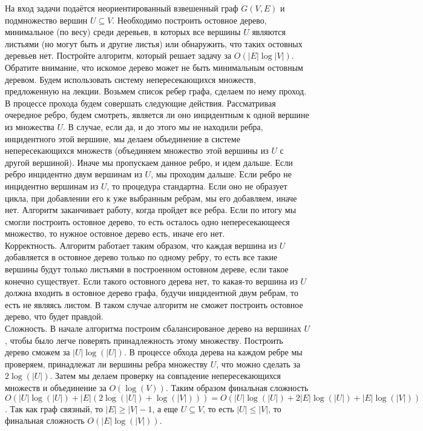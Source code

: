 \documentclass[12pt]{extreport}
\theoremstyle{definiton}
\theoremstyle{definition}
\theoremstyle{definition}
\let\leq\leqslant
\let\geq\geqslant
\begin{document}
	\Pr[4] На вход задачи подаётся неориентированный взвешенный граф $G(V,E)$ и подмножество вершин $U \subseteq V$. Необходимо построить остовное дерево, минимальное (по весу) среди деревьев, в которых все вершины $U$ являются листьями (но могут быть и другие листья) или обнаружить, что таких остовных деревьев нет. Постройте алгоритм, который решает задачу за $O(|E|\log |V|)$. Обратите внимание, что искомое дерево может не быть минимальным остовным деревом.
    \newline
    Будем использовать систему непересекающихся множеств, предложенную на лекции. Возьмем список ребер графа, сделаем по нему проход. В процессе прохода будем совершать следующие действия. Рассматривая очередное ребро, будем смотреть, является ли оно инцидентным к одной вершине из множества $U$. В случае, если да, и до этого мы не находили ребра, инцидентного этой вершине, мы делаем объединение в системе непересекающихся множеств (объединяем множество этой вершины из $U$ с другой вершиной). Иначе мы пропускаем данное ребро, и идем дальше. Если ребро инцидентно двум вершинам из $U$, мы проходим дальше. Если ребро не инцидентно вершинам из $U$, то процедура стандартна. Если оно не образует цикла, при добавлении его к уже выбранным ребрам, мы его добавляем, иначе нет. Алгоритм заканчивает работу, когда пройдет все ребра. Если по итогу мы смогли построить остовное дерево, то есть осталось одно непересекающееся множество, то нужное остовное дерево есть, иначе его нет.\\
    Корректность. Алгоритм работает таким образом, что каждая вершина из $U$ добавляется в остовное дерево только по одному ребру, то есть все такие вершины будут только листьями в построенном остовном дереве, если такое конечно существует. Если такого остовного дерева нет, то какая-то вершина из $U$ должна входить в остовное дерево графа, будучи инцидентной двум ребрам, то есть не являясь листом. В таком случае алгоритм не сможет построить остовное дерево, что будет правдой.\\
    Сложность. В начале алгоритма построим сбалансированое дерево на вершинах $U$, чтобы было легче поверять принадлежность этому множеству. Построить дерево сможем за $|U|\log(|U|)$. В процессе обхода дерева на каждом ребре мы проверяем, принадлежат ли вершины ребра множеству $U$, что можно сделать за $2\log(|U|)$. Затем мы делаем проверку на совпадение непересекающихся множеств и объединение за $O(\log(V))$. Таким образом финальная сложность $O(|U|\log(|U|) + |E|(2\log(|U|) + \log(|V|))) = O(|U|\log(|U|) + 2|E|\log(|U|) + |E|\log(|V|))$. Так как граф связный, то $|E| \geq |V| - 1$, а еще $U \subseteq V$, то есть $|U| \leq |V|$, то финальная сложность $O(|E|\log(|V|))$.
	
\end{document}
